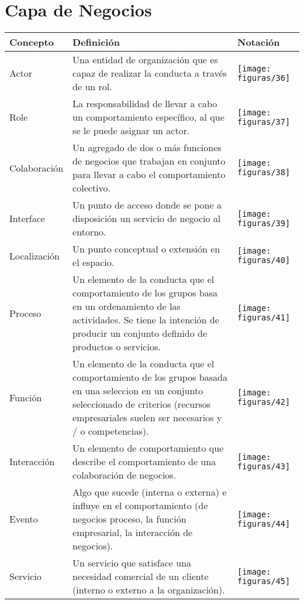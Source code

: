 \section{Capa de Negocios}
  \begin{longtable}
	{m{3cm}m{4.8cm}m{5.2cm}}
	\hline
	\rowcolor[HTML]{0073a1}
	{\color[HTML]{FFFFFF} \textbf{Concepto}} & {\color[HTML]{FFFFFF} \textbf{Definición}} & {\color[HTML]{FFFFFF} \textbf{Notación}} \\
	\hline
	 Actor & Una entidad de organización que es capaz de realizar la conducta a través de un rol. & \texttt{[image: figuras/36]} \\ \hline
	 Role & La responsabilidad de llevar a cabo un comportamiento específico, al que se le puede asignar un actor. & \texttt{[image: figuras/37]} \\ \hline
	 Colaboración\index{Colaboración} & Un agregado de dos o más funciones de negocios que trabajan en conjunto para llevar a cabo el comportamiento colectivo. & \texttt{[image: figuras/38]} \\ \hline
	 Interface\index{Interface} & Un punto de acceso donde se pone a disposición un servicio de negocio al entorno. & \texttt{[image: figuras/39]} \\ \hline
	 Localización & Un punto conceptual o extensión en el espacio. & \texttt{[image: figuras/40]} \\ \hline
	 Proceso\index{Proceso} & Un elemento de la conducta que el comportamiento de los grupos basa en un ordenamiento de las actividades. Se tiene la intención de producir un conjunto definido de productos o servicios. & \texttt{[image: figuras/41]} \\ \hline
	 Función & Un elemento de la conducta que el comportamiento de los grupos basada en una seleccion en un conjunto seleccionado de criterios (recursos empresariales suelen ser necesarios y / o competencias). & \texttt{[image: figuras/42]} \\ \hline
	 Interacción & Un elemento de comportamiento que describe el comportamiento de una colaboración de negocios. & \texttt{[image: figuras/43]} \\ \hline
	 Evento & Algo que sucede (interna o externa) e influye en el comportamiento (de negocios proceso, la función empresarial, la interacción de negocios). & \texttt{[image: figuras/44]} \\ \hline
	 Servicio\index{Servicio} & Un servicio que satisface una necesidad comercial de un cliente (interno o externo a la organización). & \texttt{[image: figuras/45]} \\ \hline

\end{longtable}
